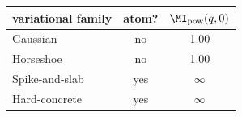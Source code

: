 \begin{tabular}{lcc}
\toprule
variational family & atom? & $\MI_{\mathrm{pow}}(q,0)$ \\
\midrule
Gaussian & no & 1.00 \\
Horseshoe & no & 1.00 \\
Spike-and-slab & yes & $\infty$ \\
Hard-concrete & yes & $\infty$ \\
\bottomrule
\end{tabular}
